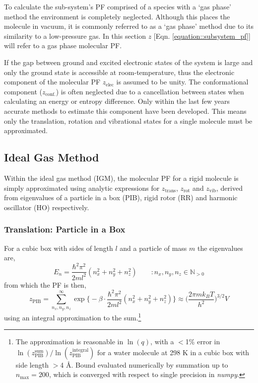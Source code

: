 \documentclass[../main.tex]{subfiles}
\begin{document}
To calculate the sub-system's PF comprised of a species with a `gas phase' method the environment is completely neglected. Although this places the molecule in vacuum, it is commonly referred to as a `gas phase' method due to its similarity to a low-pressure gas. In this section $z$ [Eqn. \eqref{equation::subsystem_pf}] will refer to a gas phase molecular PF.

If the gap between ground and excited electronic states of the system is large and only the ground state is accessible at room-temperature, thus the electronic component of the molecular PF $z_\text{elec}$ is assumed to be unity. The conformational component ($z_\text{conf.}$) is often neglected due to a cancellation between states when calculating an energy or entropy difference. Only within the last few years accurate methods to estimate this component have been developed.\cite{Chan2021, grimme2021} This means only the translation, rotation and vibrational states for a single molecule must be approximated.

\subsection{Ideal Gas Method}

Within the ideal gas method (IGM), the molecular PF for a rigid molecule is simply approximated using analytic expressions for $z_\text{trans}$, $z_\text{rot}$ and $z_\text{vib}$, derived from eigenvalues of a particle in a box (PIB), rigid rotor (RR) and harmonic oscillator (HO) respectively.\cite{mcquarrie200}

\subsubsection{Translation: Particle in a Box}

For a cubic box with sides of length $l$ and a particle of mass $m$ the eigenvalues are,
\begin{equation}
E_n = \frac{\hbar^2 \pi^2}{2ml^2}(n_x^2 + n_y^2 + n_z^2) \qquad :  n_x, n_y, n_z \in \mathbb{N}_{>0}
\end{equation}
from which the PF is then,
\begin{equation}
z_\text{PIB} = \sum_{n_x, n_y, n_z}^\infty \exp{ {\Big \{} -{\beta}\cdot  \frac{\hbar^2 \pi^2}{2ml^2}(n_x^2 + n_y^2 + n_z^2)}{\Big \}} \approx  {\Big (} \frac{2\pi m k_B T}{h^2} {\Big )}^{3/2} V 
\label{equation::z_pib_integral}
\end{equation}
using an integral approximation to the sum.\footnote{The approximation is reasonable in $\ln(q)$, with a $<$1\% error in  $\ln(z_\text{PIB}^\text{sum})/\ln(z_\text{PIB}^\text{integral})$ for a water molecule at 298 K in a cubic box with side length $>$4 \AA. Bound evaluated numerically by summation up to $n_\text{max} = 200$, which is converged with respect to single precision in \emph{numpy}.}
\end{document}

